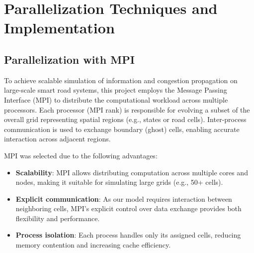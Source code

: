 \section{Parallelization Techniques and Implementation}

\subsection{Parallelization with MPI}
To achieve scalable simulation of information and congestion propagation on large-scale smart road systems, this project employs the Message Passing Interface (MPI) to distribute the computational workload across multiple processors. Each processor (MPI rank) is responsible for evolving a subset of the overall grid representing spatial regions (e.g., states or road cells). Inter-process communication is used to exchange boundary (ghost) cells, enabling accurate interaction across adjacent regions.

MPI was selected due to the following advantages:
\begin{itemize}
    \item \textbf{Scalability}: MPI allows distributing computation across multiple cores and nodes, making it suitable for simulating large grids (e.g., 50+ cells).
    \item \textbf{Explicit communication}: As our model requires interaction between neighboring cells, MPI’s explicit control over data exchange provides both flexibility and performance.
    \item \textbf{Process isolation}: Each process handles only its assigned cells, reducing memory contention and increasing cache efficiency.
\end{itemize}

